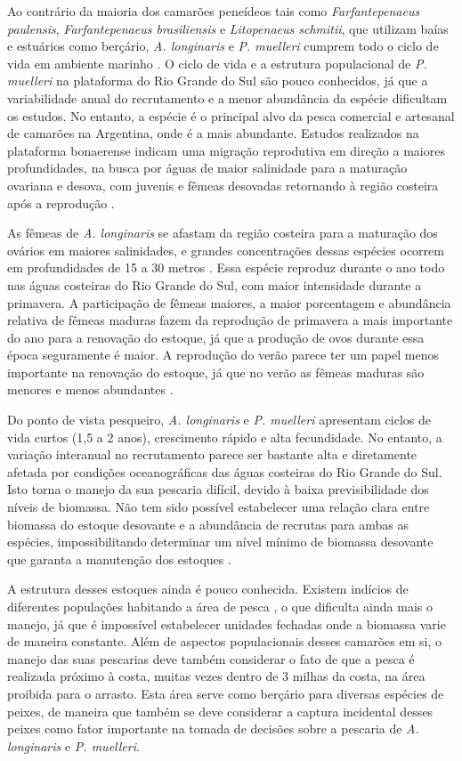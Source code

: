 \documentclass[a4paper,11pt,twoside,showtrims,onecolumn,openright,final]{memoir}
\begin{document}
Ao contrário da maioria dos camarões peneídeos tais como \emph{Farfantepenaeus paulensis}, 
\emph{Farfantepenaeus brasiliensis} e \emph{Litopenaeus schmitii}, que utilizam baías e estuários 
como berçário, \emph{A. longinaris} e \emph{P. muelleri} cumprem todo o ciclo de vida 
em ambiente marinho \citep{boschi1969,garcia1981,dincao1999}.
O ciclo de vida e a estrutura populacional de \emph{P. muelleri} na plataforma do Rio Grande do Sul 
são pouco conhecidos, já que a variabilidade anual do recrutamento e a menor abundância da 
espécie dificultam os estudos. No entanto, a espécie é o principal alvo da pesca comercial 
e artesanal de camarões na Argentina, onde é a mais abundante. Estudos realizados na plataforma 
bonaerense indicam uma migração reprodutiva em direção a maiores profundidades, na busca por 
águas de maior salinidade para a maturação ovariana e desova, com juvenis e fêmeas desovadas 
retornando à região costeira após a reprodução \citep{macchi1992}.

As fêmeas de \emph{A. longinaris} se afastam da região costeira para a maturação dos ovários 
em maiores salinidades, e grandes concentrações dessas espécies ocorrem em profundidades 
de 15 a 30 metros \citep{dumont2003}.
Essa espécie reproduz durante o ano todo nas águas costeiras do Rio Grande do Sul, com maior intensidade 
durante a primavera. A participação de fêmeas maiores, a maior porcentagem e abundância 
relativa de fêmeas maduras fazem da reprodução de primavera a mais importante do ano para 
a renovação do estoque, já que a produção de ovos durante essa época seguramente é maior. 
A reprodução do verão parece ter um papel menos importante na renovação do estoque, já que 
no verão as fêmeas maduras são menores e menos abundantes \citep{calazans2002,dumont2003}.

Do ponto de vista pesqueiro, \emph{A. longinaris} e \emph{P. muelleri} apresentam ciclos de 
vida curtos (1,5 a 2 anos), crescimento rápido e alta fecundidade. No entanto, a variação 
interanual no recrutamento parece ser bastante alta e diretamente afetada por condições 
oceanográficas das águas costeiras do Rio Grande do Sul. Isto torna o manejo da sua pescaria 
difícil, devido à baixa previsibilidade dos níveis de biomassa.  Não tem sido possível 
estabelecer uma relação clara entre biomassa do estoque desovante e a abundância de recrutas 
para ambas as espécies, impossibilitando determinar um nível mínimo de biomassa desovante que 
garanta a manutenção dos estoques \citep{macchi1992,dumont2003}.

A estrutura desses estoques ainda é pouco conhecida. Existem indícios de diferentes 
populações habitando a área de pesca \citep{nascimento1981},
o que dificulta ainda mais o manejo, já que é impossível estabelecer unidades fechadas 
onde a biomassa varie de maneira constante. Além de aspectos populacionais desses 
camarões em si, o manejo das suas pescarias deve também considerar o fato de que a 
pesca é realizada próximo à costa, muitas vezes dentro de 3 milhas da costa, na área 
proibida para o arrasto. Esta área serve como berçário para diversas espécies de peixes, 
de maneira que também se deve considerar a captura incidental desses peixes como fator 
importante na tomada de decisões sobre a pescaria de \emph{A. longinaris} e \emph{P. muelleri}.
\end{document}

